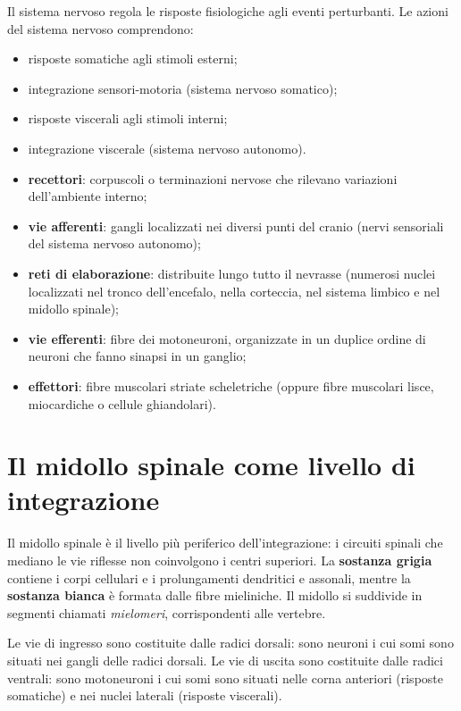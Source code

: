 Il sistema nervoso regola le risposte fisiologiche agli eventi
perturbanti. Le azioni del sistema nervoso comprendono:
\begin{itemize}
  \item risposte somatiche agli stimoli esterni;
  \item integrazione sensori-motoria (sistema nervoso somatico);
  \item risposte viscerali agli stimoli interni;
  \item integrazione viscerale (sistema nervoso autonomo).
\end{itemize}

\begin{itemize}
  \item \textbf{recettori}: corpuscoli o terminazioni nervose che
    rilevano variazioni dell'ambiente interno;
  \item \textbf{vie afferenti}: gangli localizzati nei diversi punti del
    cranio (nervi sensoriali del sistema nervoso autonomo);
  \item \textbf{reti di elaborazione}: distribuite lungo tutto il
    nevrasse (numerosi nuclei localizzati nel tronco dell'encefalo, nella
    corteccia, nel sistema limbico e nel midollo spinale);
  \item \textbf{vie efferenti}: fibre dei motoneuroni, organizzate in un
    duplice ordine di neuroni che fanno sinapsi in un ganglio;
  \item \textbf{effettori}: fibre muscolari striate scheletriche (oppure
    fibre muscolari lisce, miocardiche o cellule ghiandolari).
\end{itemize}

\section{Il midollo spinale come livello di integrazione}

Il midollo spinale è il livello più periferico dell'integrazione: i
circuiti spinali che mediano le vie riflesse non coinvolgono i centri
superiori. La \textbf{sostanza grigia} contiene i corpi cellulari e i
prolungamenti dendritici e assonali, mentre la \textbf{sostanza bianca} è
formata dalle fibre mieliniche. Il midollo si suddivide in segmenti
chiamati \textit{mielomeri}, corrispondenti alle vertebre.

Le vie di ingresso sono costituite dalle radici dorsali: sono neuroni i
cui somi sono situati nei gangli delle radici dorsali. Le vie di uscita
sono costituite dalle radici ventrali: sono motoneuroni i cui somi sono
situati nelle corna anteriori (risposte somatiche) e nei nuclei laterali
(risposte viscerali).

